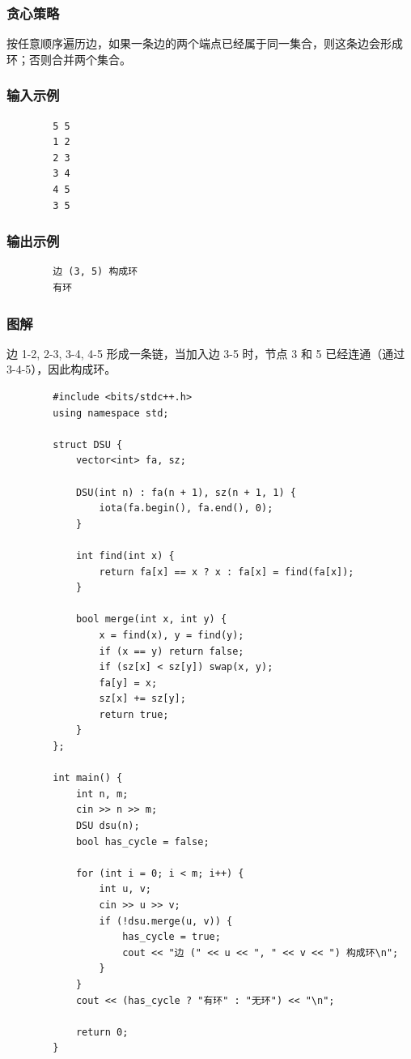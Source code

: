 \documentclass[12pt,a4paper]{ctexart}
\begin{document}
	\subsubsection*{贪心策略}
	按任意顺序遍历边，如果一条边的两个端点已经属于同一集合，则这条边会形成环；否则合并两个集合。
	
	\subsubsection*{输入示例}
	\begin{verbatim}
		5 5
		1 2
		2 3
		3 4
		4 5
		3 5
	\end{verbatim}
	
	\subsubsection*{输出示例}
	\begin{verbatim}
		边 (3, 5) 构成环
		有环
	\end{verbatim}
	
	\subsubsection*{图解}
	边 1-2, 2-3, 3-4, 4-5 形成一条链，当加入边 3-5 时，节点 3 和 5 已经连通（通过 3-4-5），因此构成环。
	
	\begin{lstlisting}
		#include <bits/stdc++.h>
		using namespace std;
		
		struct DSU {
			vector<int> fa, sz;
			
			DSU(int n) : fa(n + 1), sz(n + 1, 1) {
				iota(fa.begin(), fa.end(), 0);
			}
			
			int find(int x) {
				return fa[x] == x ? x : fa[x] = find(fa[x]);
			}
			
			bool merge(int x, int y) {
				x = find(x), y = find(y);
				if (x == y) return false;
				if (sz[x] < sz[y]) swap(x, y);
				fa[y] = x;
				sz[x] += sz[y];
				return true;
			}
		};
		
		int main() {
			int n, m;
			cin >> n >> m;
			DSU dsu(n);
			bool has_cycle = false;
			
			for (int i = 0; i < m; i++) {
				int u, v;
				cin >> u >> v;
				if (!dsu.merge(u, v)) {
					has_cycle = true;
					cout << "边 (" << u << ", " << v << ") 构成环\n";
				}
			}
			cout << (has_cycle ? "有环" : "无环") << "\n";
			
			return 0;
		}
	\end{lstlisting}
	
\end{document}
